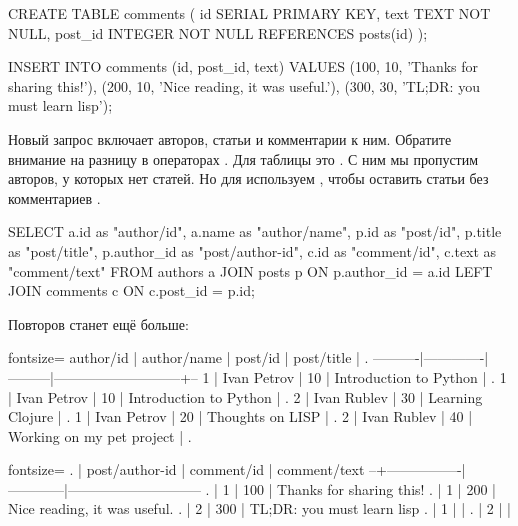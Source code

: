 \begin{english}
  \begin{sql}
CREATE TABLE comments (
  id SERIAL PRIMARY KEY,
  text TEXT NOT NULL,
  post_id INTEGER NOT NULL REFERENCES posts(id)
);

INSERT INTO
  comments (id, post_id, text)
VALUES
  (100, 10, 'Thanks for sharing this!'),
  (200, 10, 'Nice reading, it was useful.'),
  (300, 30, 'TL;DR: you must learn lisp');
  \end{sql}
\end{english}

Новый запрос включает авторов, статьи и комментарии к ним. Обратите внимание на разницу в операторах . Для таблицы  это  . С ним мы пропустим авторов, у которых нет статей. Но для  используем , чтобы оставить статьи без комментариев .

\begin{english}
  \begin{sql/lines}
SELECT
  a.id        as "author/id",
  a.name      as "author/name",
  p.id        as "post/id",
  p.title     as "post/title",
  p.author_id as "post/author-id",
  c.id        as "comment/id",
  c.text      as "comment/text"
FROM authors a
JOIN posts p ON p.author_id = a.id
LEFT JOIN comments c ON c.post_id = p.id;
  \end{sql/lines}
\end{english}

Повторов станет ещё больше:

\iflarge

\begin{english}
  \begin{text*}{fontsize=\small}
author/id | author/name | post/id |         post/title        | .
----------|-------------|---------|---------------------------+--
        1 | Ivan Petrov |      10 | Introduction to Python    | .
        1 | Ivan Petrov |      10 | Introduction to Python    | .
        2 | Ivan Rublev |      30 | Learning Clojure          | .
        1 | Ivan Petrov |      20 | Thoughts on LISP          | .
        2 | Ivan Rublev |      40 | Working on my pet project | .
  \end{text*}
\end{english}

\pagebreak[4]

\begin{english}
  \begin{text*}{fontsize=\small}
. | post/author-id | comment/id |         comment/text
--+----------------|------------|-----------------------------
. |              1 |        100 | Thanks for sharing this!
. |              1 |        200 | Nice reading, it was useful.
. |              2 |        300 | TL;DR: you must learn lisp
. |              1 |            |
. |              2 |            |
  \end{text*}
\end{english}

